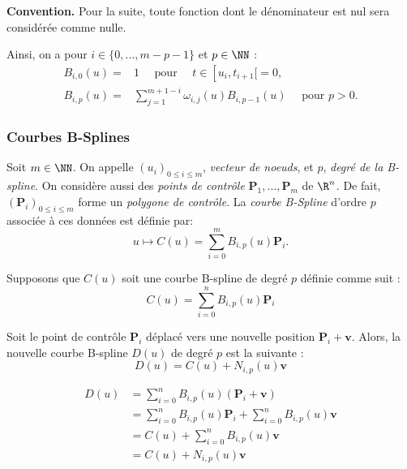 \begin{coder}
\textbf{Convention.  } Pour la suite, toute fonction dont le dénominateur est nul sera considérée comme nulle.
\end{coder}

\begin{definition}
    Ainsi, on a pour $i \in \{0, \ldots, m-p-1\}$ et $p \in \NN$ :
    \begin{align*}
        B_{i, 0}(u)=&1 \quad \text { pour } \quad t \in\left[u_i, t_{i+1}[=0\text {, }\right.\\
        B_{i, p}(u)=&\sum_{j=1}^{m+1-i} \omega_{i, j}(u)B_{i, p-1}(u) \quad \text { pour } p>0.
    \end{align*}
\end{definition}

\subsubsection{Courbes B-Splines}

\begin{definition}
    Soit $m\in\NN$. On appelle $(u_i)_{0 \leq i \leq m}$, \emph{vecteur de noeuds}, et $p$, \emph{degré de la B-spline}.
    On considère aussi des \emph{points de contrôle} $\mathbf{P}_1, \dots, \mathbf{P}_m$ de $\R^n$. De fait, $(\mathbf{P}_i)_{0 \leq i \leq m}$ forme un \emph{polygone de contrôle}.
    La \emph{courbe B-Spline} d'ordre $p$ associée à ces données est définie par:
    \begin{equation}
        u \longmapsto C(u)=\sum_{i=0}^{m} B_{i, p}(u)\mathbf{P}_i.
    \end{equation}
\end{definition}

\begin{propriete}
    Supposons que \( C(u) \) soit une courbe B-spline de degré \( p \) définie comme suit :
    \[
    C(u) = \sum_{i=0}^{n} B_{i,p}(u) \mathbf{P}_i
    \]
    
    Soit le point de contrôle \( \mathbf{P}_i \) déplacé vers une nouvelle position \( \mathbf{P}_i + \mathbf{v} \). Alors, la nouvelle courbe B-spline \( D(u) \) de degré \( p \) est la suivante \cite{pansu2004bsplines} :
    \begin{equation}
        D(u) = C(u) + N_{i,p}(u)\mathbf{v}
    \end{equation}
\end{propriete}
\begin{dem}
    \begin{align*}
        D(u) &= \sum_{i=0}^{n} B_{i,p}(u) (\mathbf{P}_i + \mathbf{v}) \\
        &= \sum_{i=0}^{n} B_{i,p}(u) \mathbf{P}_i + \sum_{i=0}^{n} B_{i,p}(u) \mathbf{v} \\
        &= C(u) + \sum_{i=0}^{n} B_{i,p}(u) \mathbf{v} \\
        &= C(u) + N_{i,p}(u) \mathbf{v}
    \end{align*}
\end{dem}
